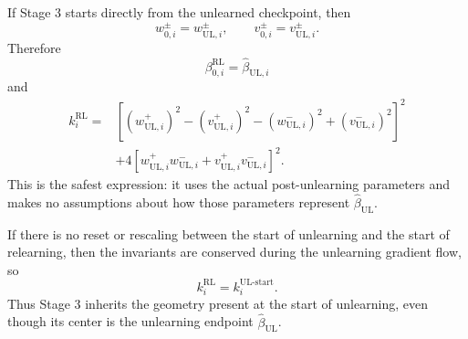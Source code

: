 \documentclass[11pt]{article}
\begin{document}
If Stage 3 starts directly from the unlearned checkpoint, then
\begin{equation}
    w_{0,i}^{\pm}=w_{\mathrm{UL},i}^{\pm},
    \qquad
    v_{0,i}^{\pm}=v_{\mathrm{UL},i}^{\pm}.
\end{equation}
Therefore
\begin{equation}
    \boxed{
    \beta_{0,i}^{\mathrm{RL}}
    =
    \widehat\beta_{\mathrm{UL},i}
    }
\end{equation}
and
\begin{equation}
    \boxed{
    \begin{aligned}
    k_i^{\mathrm{RL}}
    =
    &\left[
    (w_{\mathrm{UL},i}^{+})^2
    -
    (v_{\mathrm{UL},i}^{+})^2
    -
    (w_{\mathrm{UL},i}^{-})^2
    +
    (v_{\mathrm{UL},i}^{-})^2
    \right]^2 \\
    &+
    4
    \left[
    w_{\mathrm{UL},i}^{+}w_{\mathrm{UL},i}^{-}
    +
    v_{\mathrm{UL},i}^{+}v_{\mathrm{UL},i}^{-}
    \right]^2 .
    \end{aligned}
    }
\end{equation}
This is the safest expression: it uses the actual post-unlearning parameters and makes no assumptions about how those parameters represent \(\widehat\beta_{\mathrm{UL}}\).

If there is no reset or rescaling between the start of unlearning and the start of relearning, then the invariants are conserved during the unlearning gradient flow, so
\begin{equation}
    \boxed{
    k_i^{\mathrm{RL}}=k_i^{\mathrm{UL}\text{-}\mathrm{start}}.
    }
\end{equation}
Thus Stage 3 inherits the geometry present at the start of unlearning, even though its center is the unlearning endpoint \(\widehat\beta_{\mathrm{UL}}\).
\end{document}
